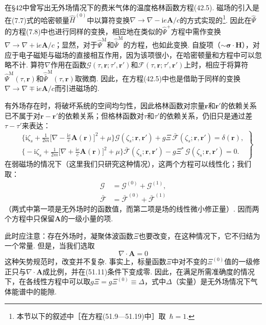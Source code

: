 在§42中曾写出无外场情况下的费米气体的温度格林函数方程(42.5). 磁场的引入是在(7.7)式的哈密顿量$\hat{H}^{(0)}$中以算符变换$\nabla\to\nabla-\mathrm{i}e\bm{A}/c$的方式实现的\footnote{本节以下的叙述中［在方程(51.9—51.19)中］取~$\hbar=1$.}. 因此在$\hat{\Psi}$的方程(7.8)中也进行同样的变换，相应地在类似的$\hat{\Psi}^+$方程中需作变换$\nabla\to\nabla+\mathrm{i}e\bm{A}/c$；显然，对于$\hat{\Psi}^{\mathrm{M}}$和$\hat{\bar{\Psi}}^{\mathrm{M}}$的方程，也如此变换. 自旋项（$\sim\bm{\sigma}\cdot\bm{H}$），对应于电子磁矩与磁场的直接相互作用，因为该项很小，在哈密顿量和方程中可以忽略不计. 算符$\nabla$作用在函数$\mathcal{G}(\tau,\bm{r};\tau',\bm{r}')$和$\mathcal{F}(\tau,\bm{r};\tau',\bm{r}')$上时，相应于将算符$\hat{\Psi}^{\mathrm{M}}(\tau,\bm{r})$和$\hat{\bar{\Psi}}^{\mathrm{M}}(\tau,\bm{r})$取微商. 因此，在方程(42.5)中也是借助于同样的变换$\nabla\to\nabla\mp\mathrm{i}e\bm{A}/c$而引进磁场的.

有外场存在时，将破坏系统的空间均匀性，因此格林函数对宗量$\bm{r}$和$\bm{r}'$的依赖关系已不属于对$\bm{r}-\bm{r}'$的依赖关系；但格林函数对$\tau$和$\tau'$的依赖关系，仍旧只是通过差$\tau-\tau'$来表达：
\begin{equation}
\left.\begin{aligned}
&\biggl\{\mathrm{i}\zeta_s+\frac{1}{2m}
\biggl[\nabla-\frac{\mathrm{i}e}{c}\bm{A}(\bm{r})\biggr]^{\!2}+\mu\biggr\}
\mathcal{G}(\zeta_s;\bm{r},\bm{r}')
+g\Xi\,\bar{\mathcal{F}}(\zeta_s;\bm{r},\bm{r}')=\delta(\bm{r}),\\
&\biggl\{-\mathrm{i}\zeta_s+\frac{1}{2m}
\biggl[\nabla+\frac{\mathrm{i}e}{c}\bm{A}(\bm{r})\biggr]^{\!2}+\mu\biggr\}
\bar{\mathcal{F}}(\zeta_s;\bm{r},\bm{r}')
-g\Xi^*\,\mathcal{G}(\zeta_s;\bm{r},\bm{r}')=0.
\end{aligned}\right\}
\end{equation}
在弱磁场的情况下（这里我们只研究这种情况），这两个方程可以线性化；我们取：
\begin{equation}
\begin{aligned}
\mathcal{G}&=\mathcal{G}^{(0)}+\mathcal{G}^{(1)},\\
\bar{\mathcal{F}}&=\bar{\mathcal{F}}^{(0)}+\bar{\mathcal{F}}^{(1)}
\end{aligned}
\end{equation}
（两式中第一项是无外场时的函数值，而第二项是场的线性微小修正量）. 因而两个方程中只保留$\bm{A}$的一级小量的项.

此时应注意：存在外场时，凝聚体波函数$\Xi$也要改变，在这种情况下，它不归结为一个常量. 但是，当我们选取
\begin{equation}
\nabla\cdot\bm{A}=0
\end{equation}
这种矢势规范时，改变并不复杂. 事实上，标量函数$\Xi$中对不变的$\Xi^{(0)}$值的一级修正只与$\nabla\cdot\bm{A}$成比例，并在(51.11)条件下变成零. 因此，在满足所需准确度的情况下，在各线性方程中可以取$g\Xi=g\Xi^{(0)}\equiv\Delta$，式中$\Delta$（实量）是无外场情况下气体能谱中的能隙.

